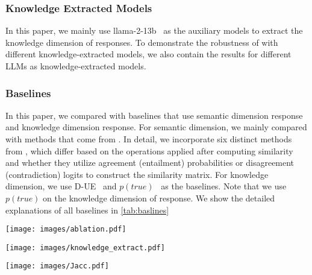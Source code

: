 \subsubsection{Knowledge Extracted Models} In this paper, we mainly use llama-2-13b~\cite{touvron2023llama} as the auxiliary models to extract the knowledge dimension of responses. To demonstrate the robustness of \ours with different knowledge-extracted models, we also contain the results for different LLMs as knowledge-extracted models.

\subsubsection{Baselines} In this paper, we compared \ours with baselines that use semantic dimension response and knowledge dimension response. For semantic dimension, we mainly compared with methods that come from \citet{lin2023generating}. In detail, we incorporate six distinct methods from \citet{lin2023generating}, which differ based on the operations applied after computing similarity and whether they utilize agreement (entailment) probabilities or disagreement (contradiction) logits to construct the similarity matrix. For knowledge dimension, we use D-UE~\cite{da2024llm} and $p(true)$~\cite{kadavath2022language} as the baselines. Note that we use $p(true)$ on the knowledge dimension of response. We show the detailed explanations of all baselines in \cref{tab:baslines}

\begin{figure*}[t]
\centering
\begin{minipage}[t]{0.32\linewidth}
  \centering
  \texttt{[image: images/ablation.pdf]}
  \label{fig:ablation}
\end{minipage}\hfill
\begin{minipage}[t]{0.32\linewidth}
  \centering
  \texttt{[image: images/knowledge\_extract.pdf]}
  \label{fig:knowledge_extract}
\end{minipage}\hfill
\begin{minipage}[t]{0.32\linewidth}
  \centering
  \texttt{[image: images/Jacc.pdf]}
  \label{fig:jacc}
\end{minipage}
\end{figure*}

